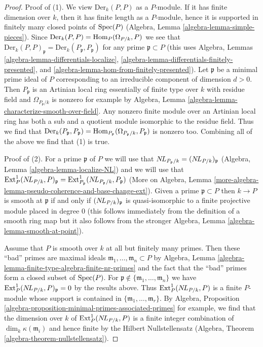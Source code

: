 \begin{proof}
Proof of (1). We view $\text{Der}_k(P, P)$ as a $P$-module.
If it has finite dimension over $k$, then it has finite length
as a $P$-module, hence it is supported in finitely many
closed points of $\mathop{\mathrm{Spec}}(P)$
(Algebra, Lemma \ref{algebra-lemma-simple-pieces}).
Since $\text{Der}_k(P, P) = \mathop{\mathrm{Hom}}\nolimits_P(\Omega_{P/k}, P)$
we see that
$\text{Der}_k(P, P)_\mathfrak p = \text{Der}_k(P_\mathfrak p, P_\mathfrak p)$
for any prime $\mathfrak p \subset P$
(this uses Algebra, Lemmas
\ref{algebra-lemma-differentials-localize},
\ref{algebra-lemma-differentials-finitely-presented}, and
\ref{algebra-lemma-hom-from-finitely-presented}).
Let $\mathfrak p$ be a minimal prime ideal of $P$
corresponding to an irreducible component of dimension $d > 0$.
Then $P_\mathfrak p$ is an Artinian local ring
essentially of finite type over $k$ with residue field
and $\Omega_{P_\mathfrak p/k}$ is nonzero for example by
Algebra, Lemma \ref{algebra-lemma-characterize-smooth-over-field}.
Any nonzero finite module over an Artinian local ring
has both a sub and a quotient module isomorphic to the residue field.
Thus we find that
$\text{Der}_k(P_\mathfrak p, P_\mathfrak p) =
\mathop{\mathrm{Hom}}\nolimits_{P_\mathfrak p}(\Omega_{P_\mathfrak p/k}, P_\mathfrak p)$
is nonzero too. Combining all of the above we find that (1) is true.

\medskip\noindent
Proof of (2). For a prime $\mathfrak p$ of $P$ we will use that
$\mathop{N\!L}\nolimits_{P_\mathfrak p/k} = (\mathop{N\!L}\nolimits_{P/k})_\mathfrak p$
(Algebra, Lemma \ref{algebra-lemma-localize-NL})
and we will
use that
$\text{Ext}_P^1(\mathop{N\!L}\nolimits_{P/k}, P)_\mathfrak p =
\text{Ext}_{P_\mathfrak p}^1(\mathop{N\!L}\nolimits_{P_\mathfrak p/k}, P_\mathfrak p)$
(More on Algebra, Lemma
\ref{more-algebra-lemma-pseudo-coherence-and-base-change-ext}).
Given a prime $\mathfrak p \subset P$
then $k \to P$ is smooth at $\mathfrak p$ if and only if
$(\mathop{N\!L}\nolimits_{P/k})_\mathfrak p$ is quasi-isomorphic
to a finite projective module placed in degree $0$ (this follows
immediately from the definition of a smooth ring map but it also
follows from the stronger Algebra, Lemma \ref{algebra-lemma-smooth-at-point}).

\medskip\noindent
Assume that $P$ is smooth over $k$ at all but finitely many primes.
Then these ``bad'' primes are maximal ideals
$\mathfrak m_1, \ldots, \mathfrak m_n \subset P$ by
Algebra, Lemma \ref{algebra-lemma-finite-type-algebra-finite-nr-primes}
and the fact that the ``bad'' primes form a closed subset of $\mathop{\mathrm{Spec}}(P)$.
For $\mathfrak p \not \in \{\mathfrak m_1, \ldots, \mathfrak m_n\}$
we have $\text{Ext}^1_P(\mathop{N\!L}\nolimits_{P/k}, P)_\mathfrak p = 0$ by the results above.
Thus $\text{Ext}^1_P(\mathop{N\!L}\nolimits_{P/k}, P)$ is a finite $P$-module
whose support is contained in $\{\mathfrak m_1, \ldots, \mathfrak m_r\}$.
By Algebra, Proposition
\ref{algebra-proposition-minimal-primes-associated-primes}
for example, we find that the dimension over $k$ of
$\text{Ext}^1_P(\mathop{N\!L}\nolimits_{P/k}, P)$ is a finite integer combination
of $\dim_k \kappa(\mathfrak m_i)$ and hence finite by
the Hilbert Nullstellensatz
(Algebra, Theorem \ref{algebra-theorem-nullstellensatz}).
\end{proof}

